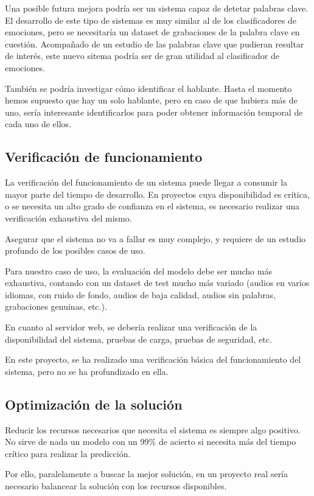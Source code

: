 Una posible futura mejora podría ser un sistema capaz de detetar palabras clave. 
El desarrollo de este tipo de sistemas es muy similar al de los clasificadores de emociones, pero se necesitaría un dataset de grabaciones de la palabra clave en cuestión.
Acompañado de un estudio de las palabras clave que pudieran resultar de interés, este nuevo sitema podría ser de gran utilidad al clasificador de emociones.

También se podría investigar cómo identificar el hablante.
Hasta el momento hemos supuesto que hay un solo hablante, pero en caso de que hubiera más de uno, sería interesante identificarlos para poder obtener información temporal de cada uno de ellos.


\subsection{Verificación de funcionamiento}
La verificación del funcionamiento de un sistema puede llegar a consumir la mayor parte del tiempo de desarrollo.
En proyectos cuya disponibilidad es crítica, o se necesita un alto grado de confianza en el sistema, es necesario realizar una verificación exhaustiva del mismo.

Asegurar que el sistema no va a fallar es muy complejo, y requiere de un estudio profundo de los posibles casos de uso.

Para nuestro caso de uso, la evaluación del modelo debe ser mucho más exhaustiva, contando con un dataset de test mucho más variado (audios en varios idiomas, con ruido de fondo, audios de baja calidad, audios sin palabras, grabaciones genuinas, etc.).

En cuanto al servidor web, se debería realizar una verificación de la disponibilidad del sistema, pruebas de carga, pruebas de seguridad, etc.

En este proyecto, se ha realizado una verificación básica del funcionamiento del sistema, pero no se ha profundizado en ella.



\subsection{Optimización de la solución}
Reducir los recursos necesarios que necesita el sistema es siempre algo positivo.
No sirve de nada un modelo con un 99\% de acierto si necesita más del tiempo crítico para realizar la predicción.

Por ello, paralelamente a buscar la mejor solución, en un proyecto real sería necesario balancear la solución con los recursos disponibles.

